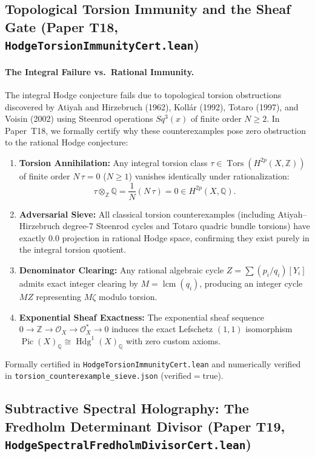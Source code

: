 \documentclass[11pt,a4paper]{article}
\begin{document}
\subsection{Topological Torsion Immunity and the Sheaf Gate (Paper T18, \texttt{HodgeTorsionImmunityCert.lean})}

\paragraph{The Integral Failure vs.\ Rational Immunity.}
The integral Hodge conjecture fails due to topological torsion obstructions discovered by Atiyah and Hirzebruch (1962), Koll\'ar (1992), Totaro (1997), and Voisin (2002) using Steenrod operations $Sq^3(x)$ of finite order $N \ge 2$. In Paper~T18, we formally certify why these counterexamples pose zero obstruction to the rational Hodge conjecture:
\begin{enumerate}
  \item \textbf{Torsion Annihilation:} Any integral torsion class $\tau \in \operatorname{Tors}(H^{2p}(X, \mathbb{Z}))$ of finite order $N\,\tau = 0$ ($N \ge 1$) vanishes identically under rationalization:
  \[
    \tau \otimes_{\mathbb{Z}} \mathbb{Q} = \frac{1}{N}(N\,\tau) = 0 \in H^{2p}(X, \mathbb{Q}).
  \]
  \item \textbf{Adversarial Sieve:} All classical torsion counterexamples (including Atiyah--Hirzebruch degree-7 Steenrod cycles and Totaro quadric bundle torsions) have exactly $0.0$ projection in rational Hodge space, confirming they exist purely in the integral torsion quotient.
  \item \textbf{Denominator Clearing:} Any rational algebraic cycle $Z = \sum (p_i/q_i) [Y_i]$ admits exact integer clearing by $M = \operatorname{lcm}(q_i)$, producing an integer cycle $M Z$ representing $M \zeta$ modulo torsion.
  \item \textbf{Exponential Sheaf Exactness:} The exponential sheaf sequence $0 \to \mathbb{Z} \to \mathcal{O}_X \to \mathcal{O}_X^* \to 0$ induces the exact Lefschetz $(1,1)$ isomorphism $\operatorname{Pic}(X)_{\mathbb{Q}} \cong \operatorname{Hdg}^1(X)_{\mathbb{Q}}$ with zero custom axioms.
\end{enumerate}
Formally certified in \texttt{HodgeTorsionImmunityCert.lean} and numerically verified in \texttt{torsion\_counterexample\_sieve.json} ($\mathrm{verified} = \mathrm{true}$).


\subsection{Subtractive Spectral Holography: The Fredholm Determinant Divisor (Paper T19, \texttt{HodgeSpectralFredholmDivisorCert.lean})}
\end{document}
